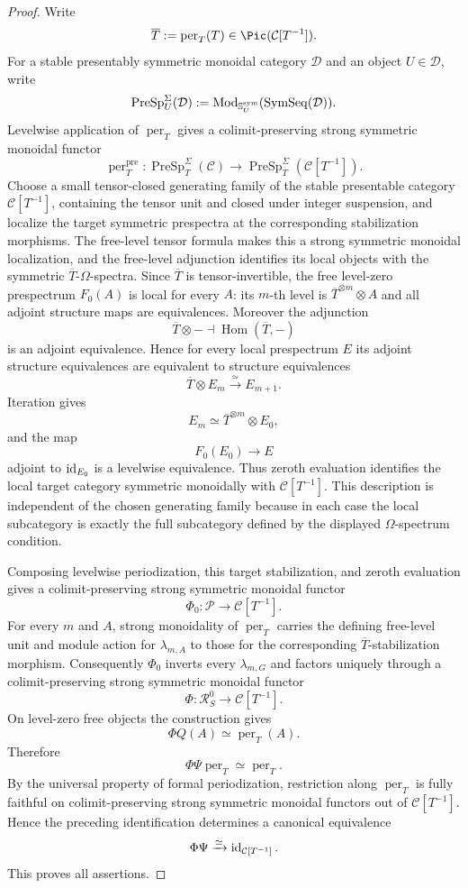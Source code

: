 \begin{proof}
Write
\[
    \overline T:=\operatorname{per}_T(T)
    \in\Pic(\mathcal C[T^{-1}]).
\]
For a stable presentably symmetric monoidal category $\mathcal D$ and an
object $U\in\mathcal D$, write
\[
    \operatorname{PreSp}^{\Sigma}_U(\mathcal D)
    :=
    \operatorname{Mod}_{\mathbb S_U^{\mathrm{sym}}}
    (\operatorname{SymSeq}(\mathcal D)).
\]
Levelwise application of $\operatorname{per}_T$ gives a colimit-preserving
strong symmetric monoidal functor
\[
    \operatorname{per}_T^{\mathrm{pre}}:
    \operatorname{PreSp}^{\Sigma}_T(\mathcal C)
    \longrightarrow
    \operatorname{PreSp}^{\Sigma}_{\overline T}
    (\mathcal C[T^{-1}]).
\]
Choose a small tensor-closed generating family of the stable presentable
category $\mathcal C[T^{-1}]$, containing the tensor unit and closed under
integer suspension, and localize the target symmetric prespectra at the
corresponding stabilization morphisms.  The free-level tensor formula makes
this a strong symmetric monoidal localization, and the free-level adjunction
identifies its local objects with the symmetric $\overline T$-$\Omega$-spectra.
Since $\overline T$ is tensor-invertible, the free level-zero prespectrum
$F_0(A)$ is local for every $A$: its $m$-th level is
$\overline T^{\otimes m}\otimes A$ and all adjoint structure maps are
equivalences.  Moreover the adjunction
\[
    \overline T\otimes-
    \dashv
    \operatorname{Hom}(\overline T,-)
\]
is an adjoint equivalence.  Hence for every local prespectrum $E$ its adjoint
structure equivalences are equivalent to structure equivalences
\[
    \overline T\otimes E_m\xrightarrow{\simeq}E_{m+1}.
\]
Iteration gives
\[
    E_m\simeq\overline T^{\otimes m}\otimes E_0,
\]
and the map
\[
    F_0(E_0)\longrightarrow E
\]
adjoint to $\operatorname{id}_{E_0}$ is a levelwise equivalence.  Thus zeroth evaluation
identifies the local target category symmetric monoidally with
$\mathcal C[T^{-1}]$.  This description is independent of the chosen
generating family because in each case the local subcategory is exactly the
full subcategory defined by the displayed $\Omega$-spectrum condition.

Composing levelwise periodization, this target stabilization, and zeroth
evaluation gives a colimit-preserving strong symmetric monoidal functor
\[
    \Phi_0:\mathcal P\longrightarrow\mathcal C[T^{-1}].
\]
For every $m$ and $A$, strong monoidality of $\operatorname{per}_T$ carries
the defining free-level unit and module action for $\lambda_{m,A}$ to those
for the corresponding $\overline T$-stabilization morphism.  Consequently
$\Phi_0$ inverts every $\lambda_{m,G}$ and factors uniquely through a
colimit-preserving strong symmetric monoidal functor
\[
    \Phi:\mathcal R_S^0\longrightarrow\mathcal C[T^{-1}].
\]
On level-zero free objects the construction gives
\[
    \Phi Q(A)\simeq\operatorname{per}_T(A).
\]
Therefore
\[
    \Phi\Psi\operatorname{per}_T
    \simeq
    \operatorname{per}_T.
\]
By the universal property of formal periodization, restriction along
$\operatorname{per}_T$ is fully faithful on colimit-preserving strong
symmetric monoidal functors out of $\mathcal C[T^{-1}]$.  Hence the preceding
identification determines a canonical equivalence
\[
    \Phi\Psi\xrightarrow{\simeq}\operatorname{id}_{\mathcal C[T^{-1}]}.
\]
This proves all assertions.
\end{proof}

